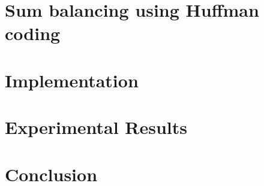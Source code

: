 \documentclass[a4paper, oneside]{memoir}
\theoremstyle{definition}
\newtheorem{lemma}{Lemma}
\begin{document}



\section{Sum balancing using Huffman coding}\label{sec:sum-balancing-using}

\section{Implementation}

\section{Experimental Results}

\section{Conclusion}
\end{document}

